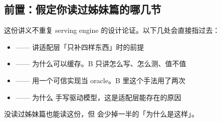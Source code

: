 \subsection{前置：假定你读过姊妹篇的哪几节}
\label{sec:b-prereq}

这份讲义不重复 serving engine 的设计论证。以下几处会直接指过去：

\begin{itemize}[itemsep=2pt]
  \item {} ——  讲适配层「只补四样东西」时的前提
  \item {} —— 为什么可以缓存。B 只讲怎么写、怎么测、值不值
  \item {} —— 用一个可信实现当 oracle。B 里这个手法用了两次
  \item {} —— 为什么  手写驱动模型，这是适配层能存在的原因
\end{itemize}

没读过姊妹篇也能读这份，但  会少掉一半的「为什么是这样」。
